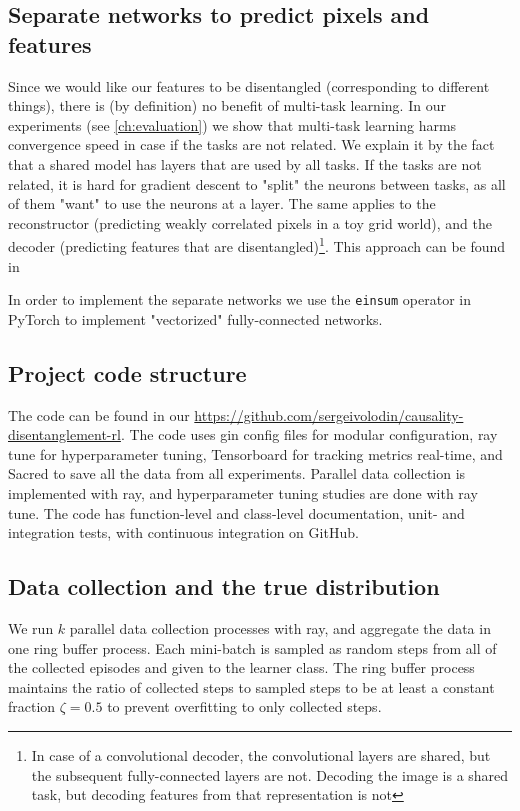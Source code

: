 \documentclass[a4paper,11pt,oneside]{report}
\begin{document}
\subsection{Separate networks to predict pixels and features}
Since we would like our features to be disentangled (corresponding to different things), there is (by definition) no benefit of multi-task learning. In our experiments (see \autoref{ch:evaluation}) we show that multi-task learning harms convergence speed in case if the tasks are not related. We explain it by the fact that a shared model has layers that are used by all tasks. If the tasks are not related, it is hard for gradient descent to "split" the neurons between tasks, as all of them "want" to use the neurons at a layer. The same applies to the reconstructor (predicting weakly correlated pixels in a toy grid world), and the decoder (predicting features that are disentangled)\footnote{In case of a convolutional decoder, the convolutional layers are shared, but the subsequent fully-connected layers are not. Decoding the image is a shared task, but decoding features from that representation is not}. This approach can be found in \cite{Ke2019}

In order to implement the separate networks we use the {\tt einsum} operator in PyTorch to implement "vectorized" fully-connected networks.

\subsection{Project code structure}
The code can be found in our \href{Github repository}{https://github.com/sergeivolodin/causality-disentanglement-rl}. The code uses gin config files for modular configuration, ray tune for hyperparameter tuning, Tensorboard for tracking metrics real-time, and Sacred to save all the data from all experiments.
Parallel data collection is implemented with ray, and hyperparameter tuning studies are done with ray tune.
The code has function-level and class-level documentation, unit- and integration tests, with continuous integration on GitHub.

\subsection{Data collection and the true distribution}
We run $k$ parallel data collection processes with ray, and aggregate the data in one ring buffer process. Each mini-batch is sampled as random steps from all of the collected episodes and given to the learner class. The ring buffer process maintains the ratio of collected steps to sampled steps to be at least a constant fraction $\zeta=0.5$ to prevent overfitting to only collected steps.
\end{document}
